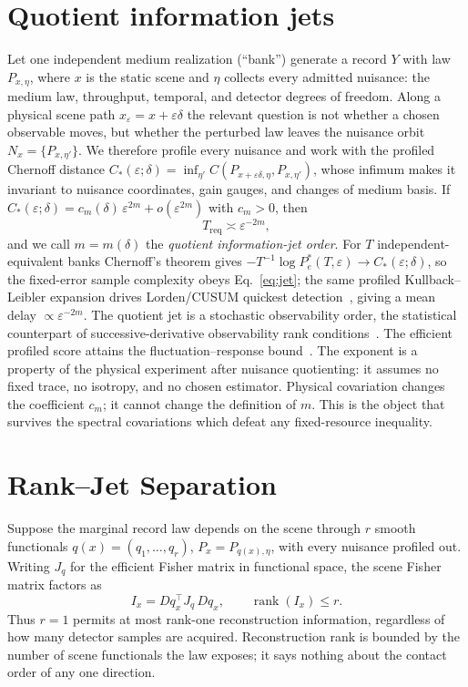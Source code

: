 \documentclass[aps,prl,reprint,groupedaddress,superscriptaddress,floatfix]{revtex4-2}
\newcommand{\Treq}{T_{\mathrm{req}}}
\newcommand{\Cstar}{C_{\ast}}
\newcommand{\rank}{\operatorname{rank}}
\newcommand{\eps}{\varepsilon}
\begin{document}
\section*{Quotient information jets}
Let one independent medium realization (``bank'') generate a record $Y$ with law
$P_{x,\eta}$, where $x$ is the static scene and $\eta$ collects every admitted
nuisance: the medium law, throughput, temporal, and detector degrees of freedom.
Along a physical scene path $x_\eps=x+\eps\delta$ the relevant question is not
whether a chosen observable moves, but whether the perturbed law leaves the
nuisance orbit $N_x=\{P_{x,\eta'}\}$. We therefore profile every nuisance and
work with the profiled Chernoff distance
$\Cstar(\eps;\delta)=\inf_{\eta'}C(P_{x+\eps\delta,\eta},P_{x,\eta'})$, whose
infimum makes it invariant to nuisance coordinates, gain gauges, and changes of
medium basis. If $\Cstar(\eps;\delta)=c_m(\delta)\,\eps^{2m}+o(\eps^{2m})$ with
$c_m>0$, then
%
\begin{equation}
\Treq\asymp\eps^{-2m},
\label{eq:jet}
\end{equation}
%
and we call $m=m(\delta)$ the \emph{quotient information-jet order}. For $T$
independent-equivalent banks Chernoff's theorem gives
$-T^{-1}\log P_e^{\ast}(T,\eps)\to\Cstar(\eps;\delta)$, so the fixed-error sample
complexity obeys Eq.~\eqref{eq:jet}; the same profiled
Kullback--Leibler expansion drives Lorden/CUSUM quickest detection~\cite{Lorden},
giving a mean delay $\propto\eps^{-2m}$. The quotient jet is a stochastic
observability order, the statistical counterpart of successive-derivative
observability rank conditions~\cite{HermannKrener}. The efficient profiled
score attains the fluctuation--response bound~\cite{Dechant}. The exponent is a property of the physical
experiment after nuisance quotienting: it assumes no fixed trace, no isotropy,
and no chosen estimator. Physical covariation changes the coefficient $c_m$; it
cannot change the definition of $m$. This is the object that survives the
spectral covariations which defeat any fixed-resource inequality.

\section*{Rank--Jet Separation}
Suppose the marginal record law depends on the scene through $r$ smooth
functionals $q(x)=(q_1,\dots,q_r)$, $P_x=P_{q(x),\eta}$, with every nuisance
profiled out. Writing $J_q$ for the efficient Fisher matrix in functional space,
the scene Fisher matrix factors as
%
\begin{equation}
I_x=Dq_x^{\!\top}J_q\,Dq_x,\qquad \rank(I_x)\le r .
\label{eq:rank}
\end{equation}
%
Thus $r=1$ permits at most rank-one reconstruction information, regardless of how
many detector samples are acquired. Reconstruction rank is bounded by the number
of scene functionals the law exposes; it says nothing about the contact order of
any one direction.
\end{document}
